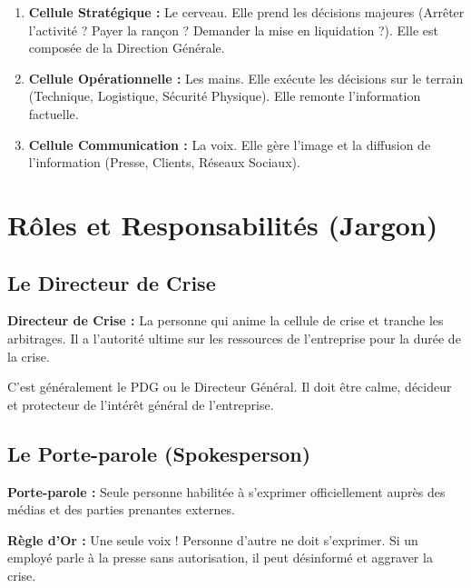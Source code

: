 \begin{enumerate}
    \item \textbf{Cellule Stratégique :} Le cerveau. Elle prend les décisions majeures (Arrêter l'activité ? Payer la rançon ? Demander la mise en liquidation ?). Elle est composée de la Direction Générale.
    \item \textbf{Cellule Opérationnelle :} Les mains. Elle exécute les décisions sur le terrain (Technique, Logistique, Sécurité Physique). Elle remonte l'information factuelle.
    \item \textbf{Cellule Communication :} La voix. Elle gère l'image et la diffusion de l'information (Presse, Clients, Réseaux Sociaux).
\end{enumerate}

\section{Rôles et Responsabilités (Jargon)}

\subsection{Le Directeur de Crise}

\begin{boxdef}
\textbf{Directeur de Crise :} La personne qui anime la cellule de crise et tranche les arbitrages. Il a l'autorité ultime sur les ressources de l'entreprise pour la durée de la crise.
\end{boxdef}

C'est généralement le PDG ou le Directeur Général. Il doit être calme, décideur et protecteur de l'intérêt général de l'entreprise.

\subsection{Le Porte-parole (Spokesperson)}

\begin{boxdef}
\textbf{Porte-parole :} Seule personne habilitée à s'exprimer officiellement auprès des médias et des parties prenantes externes.
\end{boxdef}

\begin{boxalert}
\textbf{Règle d'Or :} Une seule voix ! Personne d'autre ne doit s'exprimer. Si un employé parle à la presse sans autorisation, il peut désinformé et aggraver la crise.
\end{boxalert}

